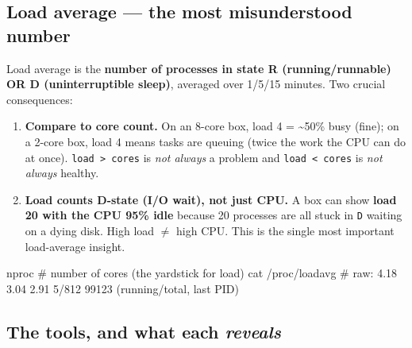 \documentclass[11pt]{article}
\providecommand{\tightlist}{\setlength{\itemsep}{1pt}\setlength{\parskip}{0pt}}
\newenvironment{Shaded}{\begin{snugshade}}{\end{snugshade}}
\newcommand{\CommentTok}[1]{\textcolor[rgb]{0.48,0.49,0.49}{#1}}
\newcommand{\ExtensionTok}[1]{\textcolor[rgb]{0.00,0.60,1.00}{\textbf{#1}}}
\newcommand{\FunctionTok}[1]{\textcolor[rgb]{0.56,0.27,0.68}{#1}}
\newcommand{\NormalTok}[1]{\textcolor[rgb]{0.81,0.81,0.76}{#1}}
\begin{document}
\subsection{Load average --- the most misunderstood number}\label{load-average--the-most-misunderstood-number}


\begin{Shaded}
\end{Shaded}

Load average is the \textbf{number of processes in state R (running/runnable) OR D (uninterruptible sleep)}, averaged over 1/5/15 minutes. Two crucial consequences:

\begin{enumerate}
\def\labelenumi{\arabic{enumi}.}
\tightlist
\item
  \textbf{Compare to core count.} On an 8-core box, load 4 = \textasciitilde50\% busy (fine); on a 2-core box, load 4 means tasks are queuing (twice the work the CPU can do at once). \texttt{load\ \textgreater{}\ cores} is \emph{not always} a problem and \texttt{load\ \textless{}\ cores} is \emph{not always} healthy.
\item
  \textbf{Load counts D-state (I/O wait), not just CPU.} A box can show \textbf{load 20 with the CPU 95\% idle} because 20 processes are all stuck in \texttt{D} waiting on a dying disk. High load \(\neq\) high CPU. This is the single most important load-average insight.
\end{enumerate}


\begin{Shaded}
\begin{Highlighting}[]
\FunctionTok{nproc}                 \CommentTok{\# number of cores (the yardstick for load)}
\FunctionTok{cat}\NormalTok{ /proc/loadavg     }\CommentTok{\# raw: 4.18 3.04 2.91 5/812 99123  (running/total, last PID)}
\end{Highlighting}
\end{Shaded}

\subsection{\texorpdfstring{The tools, and what each \emph{reveals}}{The tools, and what each reveals}}\label{the-tools-and-what-each-reveals}
\end{document}
